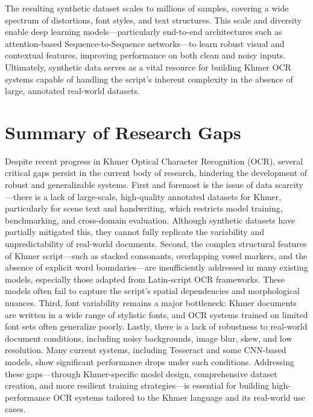 The resulting synthetic dataset scales to millions of samples, covering a wide spectrum of distortions, 
font styles, and text structures. This scale and diversity enable deep learning models—particularly 
end-to-end architectures such as attention-based Sequence-to-Sequence networks—to learn robust 
visual and contextual features, improving performance on both clean and noisy inputs. Ultimately, 
synthetic data serves as a vital resource for building Khmer OCR systems capable of handling the 
script’s inherent complexity in the absence of large, annotated real-world datasets.


\section{Summary of Research Gaps}
\label{sec:research-gaps}

Despite recent progress in Khmer Optical Character Recognition (OCR), 
several critical gaps persist in the current body of research, hindering the 
development of robust and generalizable systems. First and foremost is the issue of 
data scarcity—there is a lack of large-scale, high-quality annotated datasets for Khmer, 
particularly for scene text and handwriting, which restricts model training, benchmarking, 
and cross-domain evaluation. Although synthetic datasets have partially mitigated this, they 
cannot fully replicate the variability and unpredictability of real-world documents. Second, the 
complex structural features of Khmer script—such as stacked consonants, overlapping vowel markers, and 
the absence of explicit word boundaries—are insufficiently addressed in many existing models, 
especially those adapted from Latin-script OCR frameworks. These models often fail to 
capture the script's spatial dependencies and morphological nuances. Third, font 
variability remains a major bottleneck: Khmer documents are written in a wide range of stylistic 
fonts, and OCR systems trained on limited font sets often generalize poorly. Lastly, there is 
a lack of robustness to real-world document conditions, including noisy backgrounds, image blur, 
skew, and low resolution. Many current systems, including Tesseract and some CNN-based models, 
show significant performance drops under such conditions. Addressing these gaps—through 
Khmer-specific model design, comprehensive dataset creation, and more resilient training strategies—is 
essential for building high-performance OCR systems tailored to the Khmer language and its 
real-world use cases.